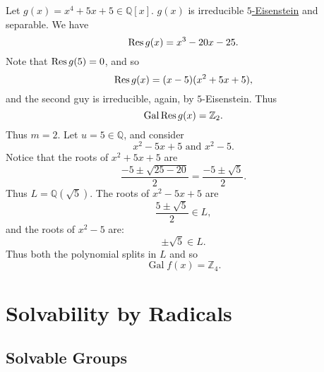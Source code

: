 \documentclass[notoc,notitlepage,nobib]{tufte-book}
\DeclareMathOperator{\Gal}{Gal}
\begin{document}
\begin{eg}
  Let $g(x) = x^4 + 5x + 5 \in \mathbb{Q}[x]$. $g(x)$ is irreducible
  \hyperref[propo:eisenstein_s_criterion]{$5$-Eisenstein} and separable. We
  have
  \begin{equation*}
    \operatorname{Res} g(x) = x^3 - 20x - 25.
  \end{equation*}
  Note that $\operatorname{Res} g(5) = 0$, and so
  \begin{equation*}
    \operatorname{Res} g(x) = (x - 5)(x^2 + 5x + 5),
  \end{equation*}
  and the second guy is irreducible, again, by $5$-Eisenstein. Thus
  \begin{equation*}
    \Gal \Res{g(x)} = \mathbb{Z}_2.
  \end{equation*}
  Thus $m = 2$. Let $u = 5 \in \mathbb{Q}$, and consider
  \begin{equation*}
    x^2 - 5x + 5 \text{ and } x^2 - 5.
  \end{equation*}
  Notice that the roots of $x^2 + 5x + 5$ are
  \begin{equation*}
    \frac{-5 \pm \sqrt{25 - 20}}{2} = \frac{-5 \pm \sqrt{5}}{2}.
  \end{equation*}
  Thus $L = \mathbb{Q}(\sqrt{5})$. The roots of $x^2 - 5x + 5$ are
   \begin{equation*}
     \frac{5 \pm \sqrt{5}}{2} \in L,
  \end{equation*}
  and the roots of $x^2 - 5$ are:
  \begin{equation*}
    \pm \sqrt{5} \in L.
  \end{equation*}
  Thus both the polynomial splits in $L$ and so
  \begin{equation*}
    \Gal f(x) = \mathbb{Z}_4.
  \end{equation*}
\end{eg}



\section{Solvability by Radicals}%
\label{sec:solvability_by_radicals}

\subsection{Solvable Groups}%
\label{sub:solvable_groups}
\end{document}

